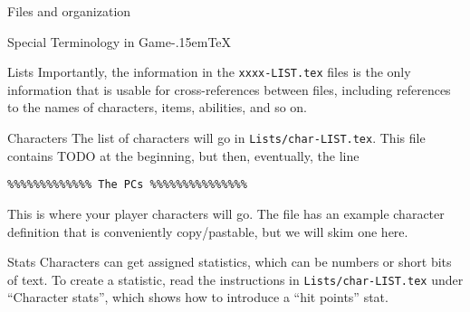 \documentclass[11pt]{article}
\def\gametex{\mbox{Game\kern-.15em\TeX}}
\begin{document}
\begin{section}{Files and organization}
\begin{subsection}{Special Terminology in \gametex{}}
\begin{subsubsection}{Lists}
Importantly, the information in the \lstinline{xxxx-LIST.tex} files is the only information that is usable for cross-references between files, including references to the names of characters, items, abilities, and so on.
\end{subsubsection}
\end{subsection}
\begin{subsection}{Characters}
\label{charlist}
The list of characters will go in \lstinline|Lists/char-LIST.tex|.  This file contains TODO at the beginning, but then, eventually, the line
\begin{verbatim}
%%%%%%%%%%%%% The PCs %%%%%%%%%%%%%%%
\end{verbatim}

This is where your player characters will go.  The file has an example character definition that is conveniently copy/pastable, but we will skim one here.

\begin{subsubsection}{Stats}
Characters can get assigned statistics, which can be numbers or short bits of text.  To create a statistic, read the instructions in \lstinline|Lists/char-LIST.tex| under ``Character stats'', which shows how to introduce a ``hit points'' stat.


\end{subsubsection}
\end{subsection}
\end{section}
\end{document}
